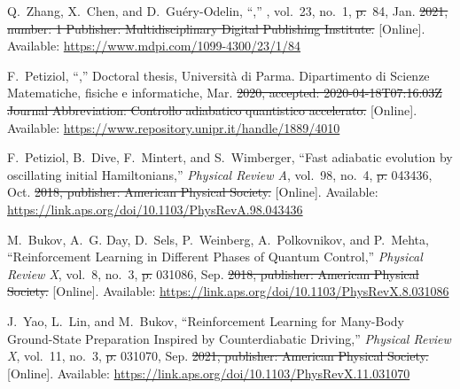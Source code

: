 \documentclass[a4paper,oneside,11pt]{book}
\providecommand{\DIFaddtex}[1]{{\protect\color{blue}\uwave{#1}}} %
\providecommand{\DIFdeltex}[1]{{\protect\color{red}\sout{#1}}}                      %
\providecommand{\DIFaddbegin}{} %
\providecommand{\DIFaddend}{} %
\providecommand{\DIFdelbegin}{} %
\providecommand{\DIFdelend}{} %
\providecommand{\DIFadd}[1]{\texorpdfstring{\DIFaddtex{#1}}{#1}} %
\providecommand{\DIFdel}[1]{\texorpdfstring{\DIFdeltex{#1}}{}} %
\newcommand{\DIFscaledelfig}{0.5}
\newlength{\DIFdelgraphicswidth} %
\newlength{\DIFdelgraphicsheight} %
\newcommand{\DIFaddincludegraphics}[2][]{{\color{blue}\fbox{\DIFOincludegraphics[#1]{#2}}}} %
\newcommand{\DIFdelincludegraphics}[2][]{%
\sbox{\DIFdelgraphicsbox}{\DIFOincludegraphics[#1]{#2}}%
\settoboxwidth{\DIFdelgraphicswidth}{\DIFdelgraphicsbox} %
\settoboxtotalheight{\DIFdelgraphicsheight}{\DIFdelgraphicsbox} %
\scalebox{\DIFscaledelfig}{%
\parbox[b]{\DIFdelgraphicswidth}{\usebox{\DIFdelgraphicsbox}\\[-\baselineskip] \rule{\DIFdelgraphicswidth}{0em}}\llap{\resizebox{\DIFdelgraphicswidth}{\DIFdelgraphicsheight}{%
\setlength{\unitlength}{\DIFdelgraphicswidth}%
\begin{picture}(1,1)%
\thicklines\linethickness{2pt} %
{\color[rgb]{1,0,0}\put(0,0){\framebox(1,1){}}}%
{\color[rgb]{1,0,0}\put(0,0){\line( 1,1){1}}}%
{\color[rgb]{1,0,0}\put(0,1){\line(1,-1){1}}}%
\end{picture}%
}\hspace*{3pt}}} %
} %
\DeclareRobustCommand{\DIFaddbegin}{\DIFOaddbegin \let\includegraphics\DIFaddincludegraphics} %
\DeclareRobustCommand{\DIFaddend}{\DIFOaddend \let\includegraphics\DIFOincludegraphics} %
\DeclareRobustCommand{\DIFdelbegin}{\DIFOdelbegin \let\includegraphics\DIFdelincludegraphics} %
\DeclareRobustCommand{\DIFdelend}{\DIFOaddend \let\includegraphics\DIFOincludegraphics} %
\begin{document}
\begin{thebibliography}{100}
\BIBentryALTinterwordspacing
Q.~Zhang, X.~Chen, and D.~Guéry-Odelin, ``,'' \emph{}, vol.~23, no.~1,
  \DIFdelbegin \DIFdel{p.}\DIFdelend ~84, Jan. \DIFdelbegin \DIFdel{2021, number: 1 Publisher: Multidisciplinary Digital Publishing
  Institute. }\DIFdelend \DIFaddbegin \DIFadd{2021. }\DIFaddend [Online]. Available:
  \url{https://www.mdpi.com/1099-4300/23/1/84}
\BIBentrySTDinterwordspacing

\BIBentryALTinterwordspacing
F.~Petiziol, ``,'' Doctoral thesis, Università di Parma. Dipartimento di Scienze
  Matematiche, fisiche e informatiche, Mar. \DIFdelbegin \DIFdel{2020, accepted:
  2020-04-18T07:16:03Z Journal Abbreviation: Controllo adiabatico quantistico
  accelerato. }\DIFdelend \DIFaddbegin \DIFadd{2020. }\DIFaddend [Online]. Available:
  \url{https://www.repository.unipr.it/handle/1889/4010}
\BIBentrySTDinterwordspacing

\BIBentryALTinterwordspacing
F.~Petiziol, B.~Dive, F.~Mintert, and S.~Wimberger, ``Fast adiabatic evolution
  by oscillating initial {Hamiltonians},'' \emph{Physical Review A}, vol.~98,
  no.~4,  \DIFdelbegin \DIFdel{p. }\DIFdelend 043436, Oct. \DIFdelbegin \DIFdel{2018, publisher: American Physical Society. }\DIFdelend \DIFaddbegin \DIFadd{2018. }\DIFaddend [Online]. Available:
  \url{https://link.aps.org/doi/10.1103/PhysRevA.98.043436}
\BIBentrySTDinterwordspacing

\BIBentryALTinterwordspacing
M.~Bukov, A.~G. Day, D.~Sels, P.~Weinberg, A.~Polkovnikov, and P.~Mehta,
  ``Reinforcement {Learning} in {Different} {Phases} of {Quantum} {Control},''
  \emph{Physical Review X}, vol.~8, no.~3,  \DIFdelbegin \DIFdel{p. }\DIFdelend 031086, Sep. \DIFdelbegin \DIFdel{2018, publisher:
  American Physical Society. }\DIFdelend \DIFaddbegin \DIFadd{2018. }\DIFaddend [Online].
  Available: \url{https://link.aps.org/doi/10.1103/PhysRevX.8.031086}
\BIBentrySTDinterwordspacing

\BIBentryALTinterwordspacing
J.~Yao, L.~Lin, and M.~Bukov, ``Reinforcement {Learning} for {Many}-{Body}
  {Ground}-{State} {Preparation} {Inspired} by {Counterdiabatic} {Driving},''
  \emph{Physical Review X}, vol.~11, no.~3,  \DIFdelbegin \DIFdel{p. }\DIFdelend 031070, Sep. \DIFdelbegin \DIFdel{2021, publisher:
  American Physical Society. }\DIFdelend \DIFaddbegin \DIFadd{2021. }\DIFaddend [Online].
  Available: \url{https://link.aps.org/doi/10.1103/PhysRevX.11.031070}
\BIBentrySTDinterwordspacing


\end{thebibliography}
\end{document}
